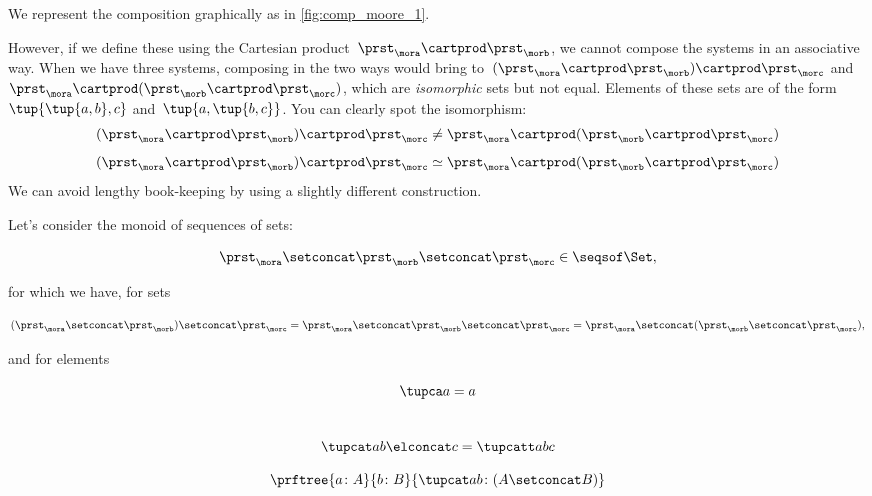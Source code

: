 We represent the composition graphically as in \cref{fig:comp_moore_1}.

However, if we define these using the Cartesian product~$\prst_{\mora} \cartprod \prst_{\morb}$, we cannot compose the systems in an associative way.
When we have three systems, composing in the two ways would bring to~$(\prst_{\mora} \cartprod \prst_{\morb}) \cartprod \prst_{\morc}$ and~$\prst_{\mora} \cartprod (\prst_{\morb} \cartprod \prst_{\morc})$, which are \emph{isomorphic} sets but not equal.
Elements of these sets are of the form~$\tup{\tup{a,b},c}$ and~$\tup{a, \tup{b,c}}$. You can clearly spot the isomorphism:
\begin{equation}
    \label{eq:assoc-fails1}
    (\prst_{\mora} \cartprod \prst_{\morb}) \cartprod \prst_{\morc} \neq \prst_{\mora} \cartprod (\prst_{\morb} \cartprod \prst_{\morc})
\end{equation}
\begin{equation}
    \label{eq:assoc-fails2}
    (\prst_{\mora} \cartprod \prst_{\morb}) \cartprod \prst_{\morc} \simeq \prst_{\mora} \cartprod (\prst_{\morb} \cartprod \prst_{\morc})
\end{equation}
We can avoid lengthy book-keeping by using a slightly different construction.

Let's consider the monoid of sequences of sets:

\begin{equation}
    \label{eq:sets-monoid}
    \prst_{\mora} \setconcat \prst_{\morb} \setconcat \prst_{\morc} \in \seqsof\Set,
\end{equation}

for which we have, for sets

\begin{equation}
    \label{eq:sets-monoid-comp}
    (\prst_{\mora} \setconcat \prst_{\morb} )\setconcat \prst_{\morc} =
    \prst_{\mora} \setconcat \prst_{\morb} \setconcat \prst_{\morc} =
    \prst_{\mora} \setconcat (\prst_{\morb} \setconcat \prst_{\morc}),
\end{equation}

and for elements

\begin{equation}
    \tupca a   = a
\end{equation}
~
\begin{equation}
    \label{eq:sets-monoid-el-cat}
    \tupcat a b \elconcat c = \tupcatt a b c
\end{equation}

\begin{equation}
    \label{eq:sets-monoid-axiom1}
    \prftree{a \colon A}{b \colon B}{ \tupcat a b \colon (A \setconcat B) }
\end{equation}

